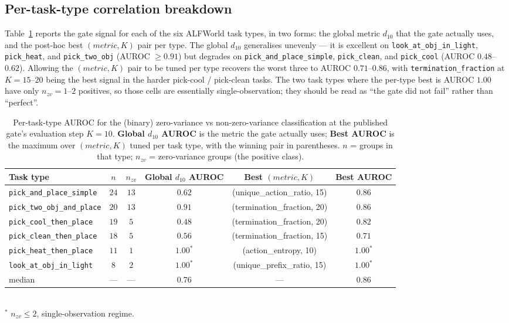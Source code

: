 \documentclass{article}
\begin{document}
\subsection{Per-task-type correlation breakdown}
\label{app:per_type}

Table~\ref{tab:per_type} reports the gate signal for each of the
six ALFWorld task types, in two forms: the global metric
$d_{10}$ that the gate actually uses, and the post-hoc best
$(metric, K)$ pair per type. The global $d_{10}$ generalises
unevenly --- it is excellent on
\texttt{look\_at\_obj\_in\_light}, \texttt{pick\_heat}, and
\texttt{pick\_two\_obj} (AUROC $\ge\!0.91$) but degrades on
\texttt{pick\_and\_place\_simple}, \texttt{pick\_clean}, and
\texttt{pick\_cool} (AUROC $0.48$--$0.62$). Allowing the
$(metric, K)$ pair to be tuned per type recovers the worst three
to AUROC $0.71$--$0.86$, with \texttt{termination\_fraction} at
$K\!=\!15$--$20$ being the best signal in the harder pick-cool /
pick-clean tasks. The two task types where the per-type best is
AUROC $1.00$ have only $n_{zv}\!=\!1$--$2$ positives, so those
cells are essentially single-observation; they should be read as
``the gate did not fail'' rather than ``perfect''.

\begin{table}[h]
\centering
\caption{Per-task-type AUROC for the (binary) zero-variance vs
non-zero-variance classification at the published gate's
evaluation step $K\!=\!10$. \textbf{Global $d_{10}$ AUROC} is the
metric the gate actually uses; \textbf{Best AUROC} is the maximum
over $(metric, K)$ tuned per task type, with the winning pair in
parentheses. $n$ = groups in that type;
$n_{zv}$ = zero-variance groups (the positive class).}
\label{tab:per_type}
\small
\begin{tabular}{lccccc}
\toprule
Task type & $n$ & $n_{zv}$ & Global $d_{10}$ AUROC & Best $(metric, K)$ & Best AUROC \\
\midrule
\texttt{pick\_and\_place\_simple}  & $24$ & $13$ & $0.62$ & (unique\_action\_ratio, 15)    & $0.86$ \\
\texttt{pick\_two\_obj\_and\_place}& $20$ & $13$ & $0.91$ & (termination\_fraction, 20)    & $0.86$ \\
\texttt{pick\_cool\_then\_place}   & $19$ &  $5$ & $0.48$ & (termination\_fraction, 20)    & $0.82$ \\
\texttt{pick\_clean\_then\_place}  & $18$ &  $5$ & $0.56$ & (termination\_fraction, 15)    & $0.71$ \\
\texttt{pick\_heat\_then\_place}   & $11$ &  $1$ & $1.00^{*}$ & (action\_entropy, 10)      & $1.00^{*}$ \\
\texttt{look\_at\_obj\_in\_light}  &  $8$ &  $2$ & $1.00^{*}$ & (unique\_prefix\_ratio, 15) & $1.00^{*}$ \\
\midrule
median                              & --- & --- & $0.76$ & ---                           & $0.86$ \\
\bottomrule
\end{tabular}\\
\vspace{2pt}
\footnotesize $^{*}$ $n_{zv}\!\le\!2$, single-observation regime.
\end{table}
\end{document}
